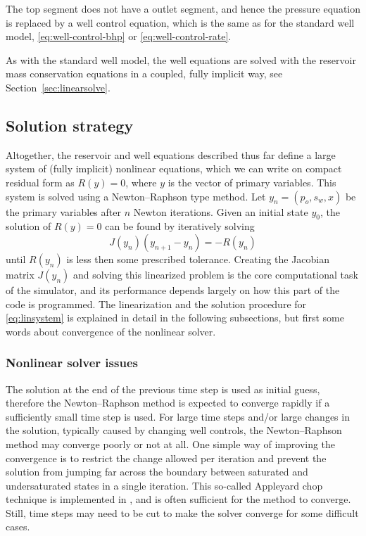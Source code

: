 The top segment does not have a outlet segment, and hence the pressure equation is
replaced by a well control equation, which is the same as for the standard well model,
\eqref{eq:well-control-bhp} or \eqref{eq:well-control-rate}.

As with the standard well model, the well
equations are solved with the reservoir mass conservation equations in a coupled, fully implicit
way, {\revised see Section~\ref{sec:linearsolve}}.


\subsection{Solution strategy}

Altogether, the reservoir and well equations described thus far define a large system of
(fully implicit) nonlinear equations, which we can write on compact residual form as
$R(y)=0$, where $y$ is the vector of primary variables.  This system is solved using a
Newton--Raphson type method. Let $y_n = (p_o, s_w, x) $ be the primary variables after $n$
Newton iterations. Given an initial state $y_0$, the solution of $R(y)=0$
can be found by iteratively solving
\begin{equation}
\label{eq:linsystem}
J(y_n) (y_{n+1} - y_n) = -R(y_n) 
\end{equation}
until $R(y_n)$ is less then some prescribed tolerance. Creating the
Jacobian matrix $J(y_n)$ and solving this linearized problem is the
core computational task of the simulator, and its performance depends largely on how this
part of the code is programmed. The linearization and the solution
procedure for \eqref{eq:linsystem} is explained in detail in the following
subsections, but first some words about convergence of the nonlinear
solver.

\subsubsection{{\revised Nonlinear solver issues}}

{\revised The solution at the end of the previous time step is used
as initial guess, therefore the Newton--Raphson method} is expected to converge
rapidly if a sufficiently small time step is used. For large time steps and/or large
changes in the solution, typically caused by changing well controls, the
Newton--Raphson method may converge poorly or not at all. One simple
way of improving the convergence is to restrict the change allowed
per iteration and prevent the solution from jumping far across the boundary
between saturated and undersaturated states in a single iteration.
This so-called Appleyard chop technique
\citep{appleyard1983nestedfactorization}
is implemented in \opmflow, and is often sufficient for the method to
converge. Still, time steps may need to be cut to make the solver converge
for some difficult cases.


